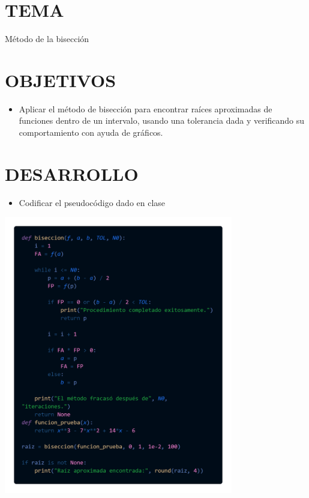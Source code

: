 \documentclass[12pt]{article}
\begin{document}
\section*{TEMA}
{Método de la bisección}

\vspace{0.5cm}

\section*{OBJETIVOS}
\begin{itemize}
    \item { Aplicar el método de bisección para encontrar raíces aproximadas de funciones dentro de un intervalo, 
    usando una tolerancia dada y verificando su comportamiento con ayuda de gráficos.}
\end{itemize}

\vspace{0.5cm}

\section*{DESARROLLO}

\begin{itemize}
    \item {Codificar el pseudocódigo dado en clase}
\end{itemize}

\begin{minipage}{0.75\textwidth}
    \raggedleft
    \includegraphics[width=0.75\textwidth]{inFiles/Figures/cdpsu.png}
\end{minipage}
\end{document}
